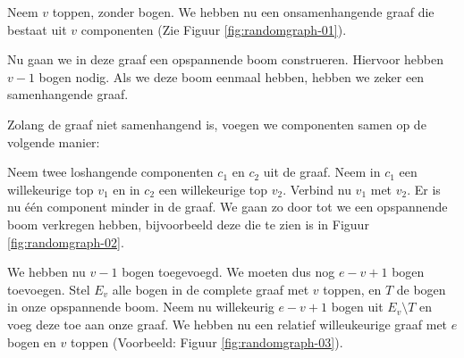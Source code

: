 \documentclass{article}
\begin{document}
Neem $v$ toppen, zonder bogen. We hebben nu een onsamenhangende graaf die
bestaat uit $v$ componenten (Zie Figuur \ref{fig:randomgraph-01}).
\newline

Nu gaan we in deze graaf een opspannende boom construeren. Hiervoor hebben
$v - 1$ bogen nodig. Als we deze boom eenmaal hebben, hebben we zeker een
samenhangende graaf. 
\newline

Zolang de graaf niet samenhangend is, voegen we componenten samen op de volgende
manier:
\newline

Neem twee loshangende componenten $c_1$ en $c_2$ uit de graaf. Neem in $c_1$ een
willekeurige top $v_1$ en in $c_2$ een willekeurige top $v_2$. Verbind nu $v_1$
met $v_2$. Er is nu \'e\'en component minder in de graaf. We gaan zo door tot
we een opspannende boom verkregen hebben, bijvoorbeeld deze die te zien is in
Figuur \ref{fig:randomgraph-02}.
\newline

We hebben nu $v - 1$ bogen toegevoegd. We moeten dus nog $e - v + 1$ bogen
toevoegen. Stel $E_v$ alle bogen in de complete graaf met $v$ toppen, en $T$ de
bogen in onze opspannende boom. Neem nu willekeurig $e - v + 1$ bogen uit
$E_v \setminus T$ en voeg deze toe aan onze graaf. We hebben nu een relatief
willeukeurige graaf met $e$ bogen en $v$ toppen (Voorbeeld: Figuur
\ref{fig:randomgraph-03}).
\end{document}

